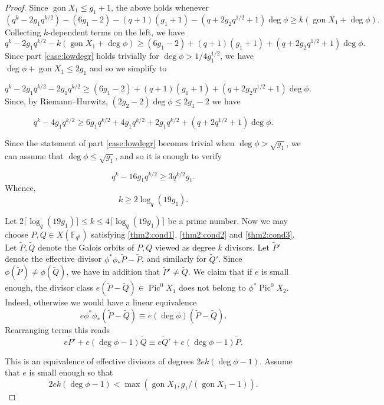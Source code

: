 \documentclass[11pt]{amsart}
\newcommand{\F}{\mathbb{F}}
\DeclareMathOperator{\Pic}{Pic}
\newcommand{\gon}{\operatorname{gon}}
\theoremstyle{definition}
\theoremstyle{remark}
\begin{document}
\begin{proof}
Since $\gon X_1 \leqslant g_1 + 1$, the above holds whenever 
\[(q^k - 2g_1q^{k/2} ) - (6g_1 - 2) - (q+ 1)(g_1 + 1) - (q+ 2g_2 q^{1/2} + 1) \deg \phi \geqslant k(\gon X_1 + \deg \phi).\]
Collecting $k$-dependent terms on the left, we have
\[q^k - 2g_1q^{k/2} - k(\gon X_1 + \deg \phi)  \geqslant (6g_1 - 2) + (q+ 1)(g_1 + 1) + (q+ 2g_2 q^{1/2} + 1) \deg \phi  . \]
Since part \eqref{case:lowdegr} holds trivially for $\deg \phi >1/4 g_1^{1/2}$, we have $\deg \phi + \gon X_1 \leqslant 2g_1$ and so we simplify to


\[q^k - 2g_1q^{k/2} - 2g_1q^{k/2}  \geqslant (6g_1 - 2) + (q+ 1)(g_1 + 1) + (q+ 2g_2 q^{1/2} + 1) \deg \phi  . \]
Since, by Riemann--Hurwitz, $(2g_2-2)\deg \phi \leqslant 2g_1-2$ we have


\[q^k - 4g_1q^{k/2}  \geqslant 6g_1q^{k/2} + 4g_1q^{k/2} + 2g_1q^{k/2} + (q+ 2q^{1/2} + 1) \deg \phi  . \]

Since the statement of part \eqref{case:lowdegr} becomes trivial when  $\deg \phi > \sqrt{g_1}$, we can assume that $\deg \phi \leqslant \sqrt{g_1}$, and so it is enough to verify

\[q^{k}-16g_1q^{k/2} \geqslant 3q^{k/2}g_1.\]
Whence,
\[k \geqslant 2 \log_q(19 g_1).\] 
 
Let $2\lceil\log_q(19g_1)\rceil \leqslant k  \leqslant 4\lceil\log_q(19g_1)\rceil$ be a prime number. Now we may choose $P, Q \in X(\F_{q^k})$ satisfying \ref{thm2:cond1}, \ref{thm2:cond2} and \ref{thm2:cond3}. Let $\tilde{P}, \tilde{Q}$ denote the Galois orbits of $P, Q$ viewed as degree $k$ divisors.  Let $\tilde{P}'$ denote the effective divisor $\phi^*\phi_* \tilde P - \tilde P$, and similarly for $\tilde{Q}'$. Since $\phi (\tilde{P}) \neq \phi(\tilde{Q})$, we have in addition that $\tilde{P}' \neq \tilde{Q}$. We claim that if $e$ is small enough, the divisor class $e(\tilde{P}-\tilde{Q}) \in \Pic^0 X_1$ does not belong to $\phi^* \Pic^0 X_2$. Indeed, otherwise we would have a linear equivalence \[e \phi^*\phi_*(\tilde{P}-\tilde{Q}) \equiv  e (\deg \phi) (\tilde{P}-\tilde{Q}).\]
Rearranging terms this reads
\begin{equation}\label{linear-equiv-2}
e\tilde{P}'+e(\deg \phi - 1)\tilde{Q}\equiv e\tilde{Q}'+e(\deg \phi - 1)\tilde{P}.\tag{$\star$}
\end{equation}

This is an equivalence of effective divisors of degrees $2ek(\deg \phi-1) $. Assume that $e$ is small enough so that \[2ek(\deg \phi -1)  < \max \left(\gon X_1, g_1/(\gon X_1 - 1)\right).\]


\end{proof}
\end{document}
